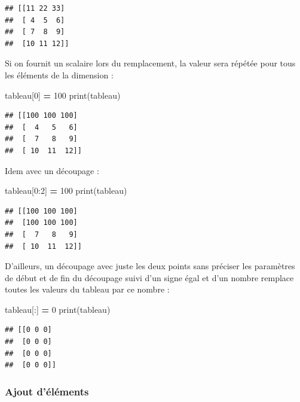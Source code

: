 \documentclass[12pt,]{book}
\newenvironment{Shaded}{\begin{snugshade}}{\end{snugshade}}
\newcommand{\DecValTok}[1]{\textcolor[rgb]{0.00,0.00,0.81}{#1}}
\newcommand{\OperatorTok}[1]{\textcolor[rgb]{0.81,0.36,0.00}{\textbf{#1}}}
\newcommand{\BuiltInTok}[1]{#1}
\newcommand{\NormalTok}[1]{#1}
\numberwithin{equation}{section}
\numberwithin{countremarque}{section}
\begin{document}
\begin{lstlisting}
## [[11 22 33]
##  [ 4  5  6]
##  [ 7  8  9]
##  [10 11 12]]
\end{lstlisting}

Si on fournit un scalaire lors du remplacement, la valeur sera répétée
pour tous les éléments de la dimension :

\begin{Shaded}
\begin{Highlighting}[]
\NormalTok{tableau[}\DecValTok{0}\NormalTok{] }\OperatorTok{=} \DecValTok{100}
\BuiltInTok{print}\NormalTok{(tableau)}
\end{Highlighting}
\end{Shaded}

\begin{lstlisting}
## [[100 100 100]
##  [  4   5   6]
##  [  7   8   9]
##  [ 10  11  12]]
\end{lstlisting}

Idem avec un découpage :

\begin{Shaded}
\begin{Highlighting}[]
\NormalTok{tableau[}\DecValTok{0}\NormalTok{:}\DecValTok{2}\NormalTok{] }\OperatorTok{=} \DecValTok{100}
\BuiltInTok{print}\NormalTok{(tableau)}
\end{Highlighting}
\end{Shaded}

\begin{lstlisting}
## [[100 100 100]
##  [100 100 100]
##  [  7   8   9]
##  [ 10  11  12]]
\end{lstlisting}

D'ailleurs, un découpage avec juste les deux points sans préciser les
paramètres de début et de fin du découpage suivi d'un signe égal et d'un
nombre remplace toutes les valeurs du tableau par ce nombre :

\begin{Shaded}
\begin{Highlighting}[]
\NormalTok{tableau[:] }\OperatorTok{=} \DecValTok{0}
\BuiltInTok{print}\NormalTok{(tableau)}
\end{Highlighting}
\end{Shaded}

\begin{lstlisting}
## [[0 0 0]
##  [0 0 0]
##  [0 0 0]
##  [0 0 0]]
\end{lstlisting}

\subsubsection{Ajout d'éléments}\label{ajout-delements-2}
\end{document}
